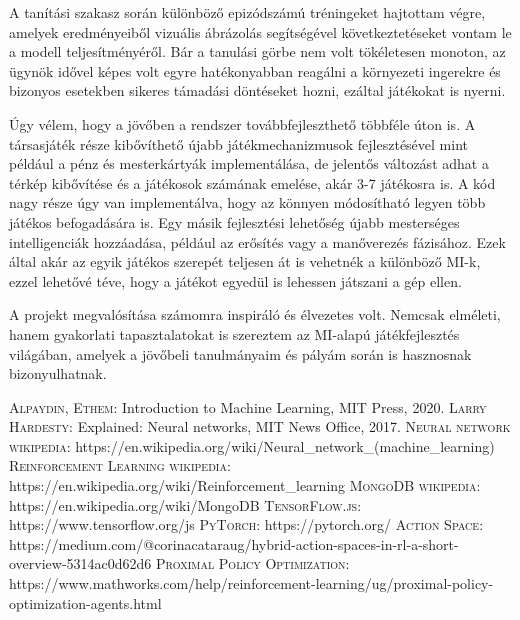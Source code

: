 \documentclass[
]{thesis-ekf}
\theoremstyle{definition}
\theoremstyle{remark}
\begin{document}
	A tanítási szakasz során különböző epizódszámú tréningeket hajtottam végre, amelyek eredményeiből vizuális ábrázolás segítségével következtetéseket vontam le a modell teljesítményéről. Bár a tanulási görbe nem volt tökéletesen monoton, az ügynök idővel képes volt egyre hatékonyabban reagálni a környezeti ingerekre és bizonyos esetekben sikeres támadási döntéseket hozni, ezáltal játékokat is nyerni. 
	
	Úgy vélem, hogy a jövőben a rendszer továbbfejleszthető többféle úton is. A társasjáték része kibővíthető újabb játékmechanizmusok fejlesztésével mint például a pénz és mesterkártyák implementálása, de jelentős változást adhat a térkép kibővítése és a játékosok számának emelése, akár 3-7 játékosra is. A kód nagy része úgy van implementálva, hogy az könnyen módosítható legyen több játékos befogadására is. Egy másik fejlesztési lehetőség újabb mesterséges intelligenciák hozzáadása, például az erősítés vagy a manőverezés fázisához. Ezek által akár az egyik játékos szerepét teljesen át is vehetnék a különböző MI-k, ezzel lehetővé téve, hogy a játékot egyedül is lehessen játszani a gép ellen.
	
	A projekt megvalósítása számomra inspiráló és élvezetes volt. Nemcsak elméleti, hanem gyakorlati tapasztalatokat is szereztem az MI-alapú játékfejlesztés világában, amelyek a jövőbeli tanulmányaim és pályám során is hasznosnak bizonyulhatnak. 
	
	\begin{thebibliography}{2}
		\textsc{Alpaydin, Ethem}: Introduction to Machine Learning, MIT Press, 2020.
		\textsc{Larry Hardesty}: Explained: Neural networks, MIT News Office, 2017. 
		\textsc{Neural network wikipedia}: https://en.wikipedia.org/wiki/Neural\_network\_(machine\_learning)
		\textsc{Reinforcement Learning wikipedia}: https://en.wikipedia.org/wiki/Reinforcement\_learning
		\textsc{MongoDB wikipedia}: https://en.wikipedia.org/wiki/MongoDB
		\textsc{TensorFlow.js}: https://www.tensorflow.org/js
		\textsc{PyTorch}: https://pytorch.org/
		\textsc{Action Space}: https://medium.com/@corinacataraug/hybrid-action-spaces-in-rl-a-short-overview-5314ac0d62d6
		\textsc{Proximal Policy Optimization}: https://www.mathworks.com/help/reinforcement-learning/ug/proximal-policy-optimization-agents.html
	\end{thebibliography}
	
	
	
\end{document}
